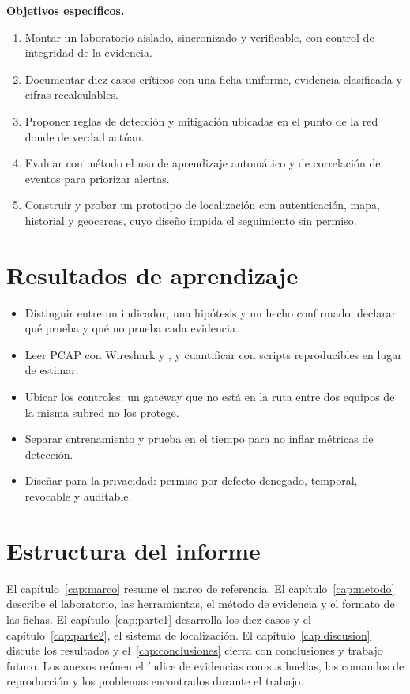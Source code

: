 \textbf{Objetivos específicos.}
\begin{enumerate}
\item Montar un laboratorio aislado, sincronizado y verificable, con control de integridad de la evidencia.
\item Documentar diez casos críticos con una ficha uniforme, evidencia clasificada y cifras recalculables.
\item Proponer reglas de detección y mitigación ubicadas en el punto de la red donde de verdad actúan.
\item Evaluar con método el uso de aprendizaje automático y de correlación de eventos para priorizar alertas.
\item Construir y probar un prototipo de localización con autenticación, mapa, historial y geocercas, cuyo diseño impida el seguimiento sin permiso.
\end{enumerate}

\section{Resultados de aprendizaje}
\begin{itemize}
\item Distinguir entre un indicador, una hipótesis y un hecho confirmado; declarar qué prueba y qué no prueba cada evidencia.
\item Leer PCAP con Wireshark y , y cuantificar con scripts reproducibles en lugar de estimar.
\item Ubicar los controles: un gateway que no está en la ruta entre dos equipos de la misma subred no los protege.
\item Separar entrenamiento y prueba en el tiempo para no inflar métricas de detección.
\item Diseñar para la privacidad: permiso por defecto denegado, temporal, revocable y auditable.
\end{itemize}

\section{Estructura del informe}
El capítulo~\ref{cap:marco} resume el marco de referencia. El capítulo~\ref{cap:metodo} describe el laboratorio, las herramientas, el método de evidencia y el formato de las fichas. El capítulo~\ref{cap:parte1} desarrolla los diez casos y el capítulo~\ref{cap:parte2}, el sistema de localización. El capítulo~\ref{cap:discusion} discute los resultados y el~\ref{cap:conclusiones} cierra con conclusiones y trabajo futuro. Los anexos reúnen el índice de evidencias con sus huellas, los comandos de reproducción y los problemas encontrados durante el trabajo.
